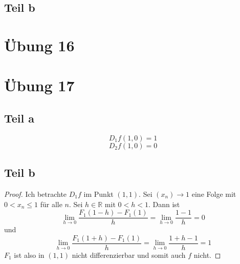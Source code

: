 \documentclass[10pt,a4paper]{article}
\begin{document}
\subsection*{Teil b}

\section*{Übung 16}

\section*{Übung 17}

\subsection*{Teil a}

\begin{equation}
D_{1} f(1, 0) = 1
\end{equation}
\begin{equation}
D_{2} f(1, 0) = 0
\end{equation}

\subsection*{Teil b}

\begin{proof}
Ich betrachte $D_{1}f$ im Punkt $(1, 1)$.
Sei $(x_{n}) \rightarrow 1$ eine Folge mit $0 < x_{n} \le 1$ für alle $n$.
Sei $h \in \mathbb{R}$ mit $0 < h < 1$.
Dann ist
\begin{equation}
\lim_{h \rightarrow 0} \frac{F_{1}(1 - h) - F_{1}(1)}{h} = \lim_{h \rightarrow 0} \frac{1 - 1}{h} = 0
\end{equation}
und
\begin{equation}
\lim_{h \rightarrow 0} \frac{F_{1}(1 + h) - F_{1}(1)}{h} = \lim_{h \rightarrow 0} \frac{1 + h - 1}{h} = 1
\end{equation}
$F_{1}$ ist also in $(1, 1)$ nicht differenzierbar und somit auch $f$ nicht.
\end{proof}
\end{document}
